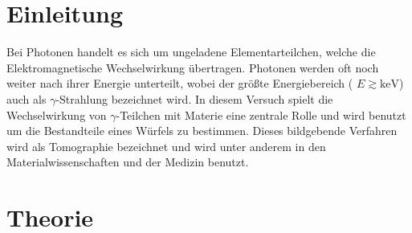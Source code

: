 \section{Einleitung}
Bei Photonen handelt es sich um  ungeladene Elementarteilchen, welche die Elektromagnetische Wechselwirkung übertragen. Photonen werden oft noch weiter nach ihrer Energie unterteilt, wobei der größte Energiebereich ( $E \gtrsim \si{\keV}$) auch als $\gamma$-Strahlung bezeichnet wird.
In diesem Versuch spielt die Wechselwirkung von $\gamma$-Teilchen mit Materie eine zentrale Rolle und wird benutzt um die Bestandteile eines Würfels zu bestimmen. Dieses bildgebende Verfahren wird als Tomographie bezeichnet und wird unter anderem in den Materialwissenschaften und der Medizin benutzt.
\section{Theorie}
